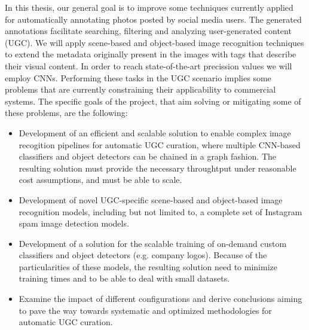 In this thesis, our general goal is to improve some techniques currently applied for automatically annotating photos posted by social media users. The generated annotations facilitate searching, filtering and analyzing user-generated content (UGC). We will apply scene-based and object-based image recognition techniques to extend the metadata originally present in the images with tags that describe their visual content. In order to reach state-of-the-art precission values we will employ CNNs. Performing these tasks in the UGC scenario implies some problems that are currently constraining their applicability to commercial systems. The specific goals of the project, that aim solving or mitigating some of these problems, are the following:

\begin{itemize} 
\item
Development of an efficient and scalable solution to enable complex image recogition pipelines for automatic UGC curation, where multiple CNN-based classifiers and object detectors can be chained in a graph fashion. The resulting solution must provide the necessary throughtput under reasonable cost assumptions, and must be able to scale. 
\item
Development of novel UGC-specific scene-based and object-based image recognition models, including but not limited to, a complete set of Instagram spam image detection models. 
\item
Development of a solution for the scalable training of on-demand custom classifiers and object detectors (e.g. company logos). Because of the particularities of these models, the resulting solution need to minimize training times and to be able to deal with small datasets. 
\item
Examine the impact of different configurations and derive conclusions aiming to pave the way towards systematic and optimized methodologies for automatic UGC curation.
\end{itemize} 



